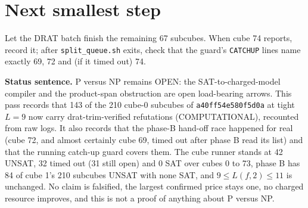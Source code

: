\documentclass[11pt]{article}
\begin{document}
\section*{Next smallest step}
Let the DRAT batch finish the remaining 67 subcubes. When cube 74 reports, record it; after \texttt{split\_queue.sh} exits, check that the guard's \texttt{CATCHUP} lines name exactly 69, 72 and (if it timed out) 74.

\bigskip
\noindent\textbf{Status sentence.} P versus NP remains OPEN: the SAT-to-charged-model compiler and the product-span obstruction are open load-bearing arrows. This pass records that 143 of the 210 cube-0 subcubes of \texttt{a40ff54e580f5d0a} at tight $L=9$ now carry drat-trim-verified refutations (COMPUTATIONAL), recounted from raw logs. It also records that the phase-B hand-off race happened for real (cube 72, and almost certainly cube 69, timed out after phase B read its list) and that the running catch-up guard covers them. The cube runner stands at 42 UNSAT, 32 timed out (31 still open) and 0 SAT over cubes 0 to 73, phase B has 84 of cube 1's 210 subcubes UNSAT with none SAT, and $9\le L(f,2)\le 11$ is unchanged. No claim is falsified, the largest confirmed price stays one, no charged resource improves, and this is not a proof of anything about P versus NP.
\end{document}
